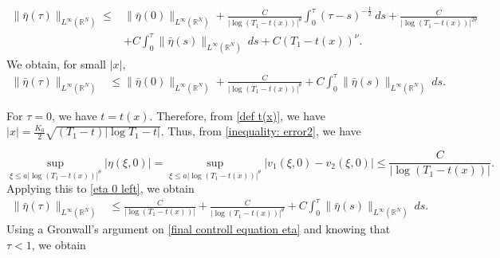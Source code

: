 \documentclass[11pt,a4paper]{article}
\newcommand{\1}{\mathbbm{1}}
\numberwithin{equation}{section}
\newcommand{\numberset}{\mathbb}
\newcommand{\R}{\numberset{R}}
\theoremstyle{remark}
\begin{document}
\begin{equation*}
\begin{split}
\|\bar{\eta}(\tau)\|_{L^\infty(\R^N)}\leq&\|\bar{\eta}(0)\|_{L^\infty(\R^N)}+\frac{C}{|\log (T_1-t(x))|^{\theta}}\int^\tau_0(\tau-s)^{-\frac{1}{2}}\ ds+\frac{C}{|\log (T_1-t(x))|^{2\theta}}\\
&+C\int^\tau_0 \|\bar{\eta}(s)\|_{L^\infty(\R^N)}\ ds+C(T_1-t(x))^{\nu }.
\end{split}
\end{equation*}
We obtain, for small $|x|$,
\begin{equation}\label{eta 0 left}
\begin{split}
\|\bar{\eta}(\tau)\|_{L^\infty(\R^N)}&\leq\|\bar{\eta}(0)\|_{L^\infty(\R^N)}+\frac{C}{|\log (T_1-t(x))|^{\theta}}+C\int^\tau_0 \|\bar{\eta}(s)\|_{L^\infty(\R^N)}\ ds.
\end{split}
\end{equation}

For $\tau=0$, we have $t=t(x)$. Therefore, from \eqref{def t(x)}, we have $|x|= \frac{K_0}{2}\sqrt{(T_1-t)|\log T_1-t|}$. Thus, from \eqref{inequality: error2}, we have

\begin{equation*}
\underset{\xi\leq a |\log(T_1-t(x))|^{\theta}}{\sup}|\eta(\xi,0)|=\underset{\xi\leq a |\log(T_1-t(x))|^{\theta}}{\sup}\left|v_1(\xi,0)-v_2(\xi,0)\right|\leq \frac{C}{|\log(T_1-t(x))|}.
\end{equation*}
Applying this to \eqref{eta 0 left}, we obtain
\begin{equation}\label{final controll equation eta}
\begin{split}
\|\bar{\eta}(\tau)\|_{L^\infty(\R^N)}&\leq \frac{C}{|\log(T_1-t(x))|}+\frac{C}{|\log (T_1-t(x))|^{\theta}}+C\int^\tau_0 \|\bar{\eta}(s)\|_{L^\infty(\R^N)}\ ds.
\end{split}
\end{equation}
Using a Gronwall's argument on \eqref{final controll equation eta} and knowing that $\tau <1$, we obtain
\end{document}
